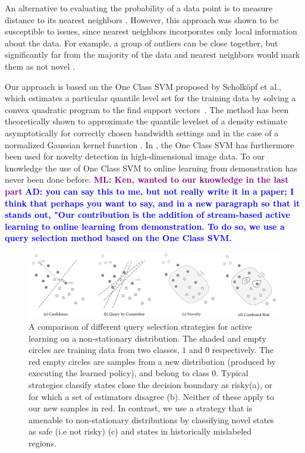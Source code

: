 \documentclass[10pt, conference]{ieeeconf}      %
\newcommand{\adnote}[1]{\ifthenelse{ \boolean{include-notes}}%
 {\textcolor{blue}{\textbf{AD: #1}}}{}}
\newcommand{\mlnote}[1]{\ifthenelse{ \boolean{include-notes}}%
 {\textcolor{purple}{\textbf{ML: #1}}}{}}
\begin{document}
An alternative to evaluating the probability of a data point is to measure distance to its nearest neighbors \cite{knox1998algorithms}. However, this approach was shown to be
susceptible to issues, since nearest neighbors  incorporates only local information about the data. For example, a group of outliers can be close together, but significantly far from the majority of the data and nearest neighbors would mark them as not novel \cite{hodge2004survey}.

Our approach is based on the One Class SVM proposed by Scholk{\"o}pf et al., which estimates a particular quantile level set for the training data by solving a convex quadratic program  to the find support
vectors~\cite{scholkopf2001estimating}. The method has been theoretically shown to approximate the quantile levelset of a density estimate
asymptotically for correctly chosen bandwidth settings and in the case of a normalized Gaussian kernel function \cite{vert2006consistency}. 
In \cite{liu2014unsupervised}, the One Class SVM has furthermore been used for novelty detection in high-dimensional image data. To our knowledge the use of One Class SVM to online learning from demonstration has never been done before. \mlnote{Ken, wanted to our knowledge in the last part} \adnote{you can say this to me, but not really write it in a paper; I think that perhaps you want to say, and in a new paragraph so that it stands out, "Our contribution is the addition of stream-based active learning to online learning from demonstration. To do so, we use a query selection method based on the One Class SVM.}


\begin{figure}[t]
\centering

\includegraphics[width=\textwidth]{figures/active_learning.pdf}

\caption{A comparison of different query selection strategies for active learning on a non-stationary distribution. The shaded and empty circles are training data from two classes, $1$ and $0$ respectively. The red empty circles are samples from a new distribution (produced by executing the learned policy), and belong to class $0$. Typical strategies classify states close the decision boundary as risky(a), or for which a set of estimators disagree (b). Neither of these apply to our new samples in red. In contrast, we use a strategy that is amenable to non-stationary distributions by classifying  novel states as safe (i.e not risky) (c) and states in historically mislabeled regions. }
\label{fig:support_example}
\end{figure}
\end{document}
